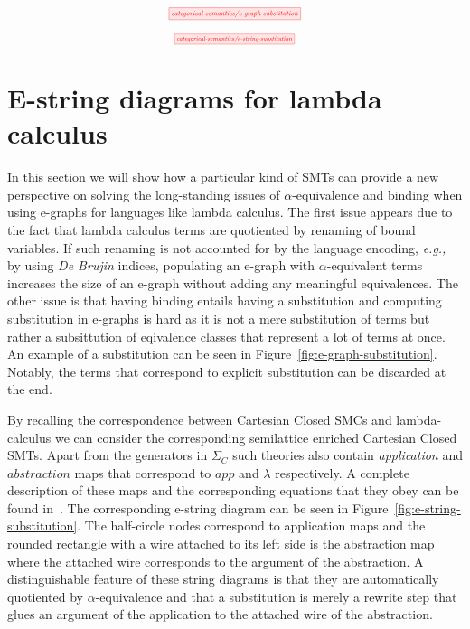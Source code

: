 \documentclass[sigconf, 9pt, nonacm]{acmart}
\theoremstyle{definition}
\begin{document}
\begin{figure*}
    \[
        \scalebox{0.55}{
        \tikzfig{categorical-semantics/e-graph-substitution}
        }
    \]
    \caption{E-graph explicit substitution example.}
    \label{fig:e-graph-substitution}
\end{figure*}

\begin{figure*}
    \[
        \scalebox{0.5}{
        \tikzfig{categorical-semantics/e-string-substitution}
        }
    \]
    \caption{E-string diagrammatic substitution example.}
    \label{fig:e-string-substitution}
\end{figure*}

\section{E-string diagrams for lambda calculus}
In this section we will show how a particular kind of SMTs can provide a new perspective on solving the long-standing issues of $\alpha$-equivalence and binding when using e-graphs for languages like lambda calculus.
The first issue appears due to the fact that lambda calculus terms are quotiented by renaming of bound variables.
If such renaming is not accounted for by the language encoding, \textit{e.g.,} by using \textit{De Brujin} indices, populating an e-graph with $\alpha$-equivalent terms increases the size of an e-graph without adding any meaningful equivalences.
The other issue is that having binding entails having a substitution and computing substitution in e-graphs is hard as it is not a mere substitution of terms but rather a subsittution of eqivalence classes that represent a lot of terms at once.
An example of a substitution can be seen in Figure~\ref{fig:e-graph-substitution}.
Notably, the terms that correspond to explicit substitution can be discarded at the end.

By recalling the correspondence between Cartesian Closed SMCs and lambda-calculus we can consider the corresponding semilattice enriched Cartesian Closed SMTs.
Apart from the generators in $\Sigma_{C}$ such theories also contain \textit{application} and $\textit{abstraction}$ maps that correspond to $app$ and $\lambda$ respectively.
A complete description of these maps and the corresponding equations that they obey can be found in~\cite{ghica-zanassi2023string}.
The corresponding e-string diagram can be seen in Figure~\ref{fig:e-string-substitution}.
The half-circle nodes correspond to application maps and the rounded rectangle with a wire attached to its left side is the abstraction map where the attached wire corresponds to the argument of the abstraction.
A distinguishable feature of these string diagrams is that they are automatically quotiented by $\alpha$-equivalence and that a substitution is merely a rewrite step that glues an argument of the application to the attached wire of the abstraction.
\end{document}
